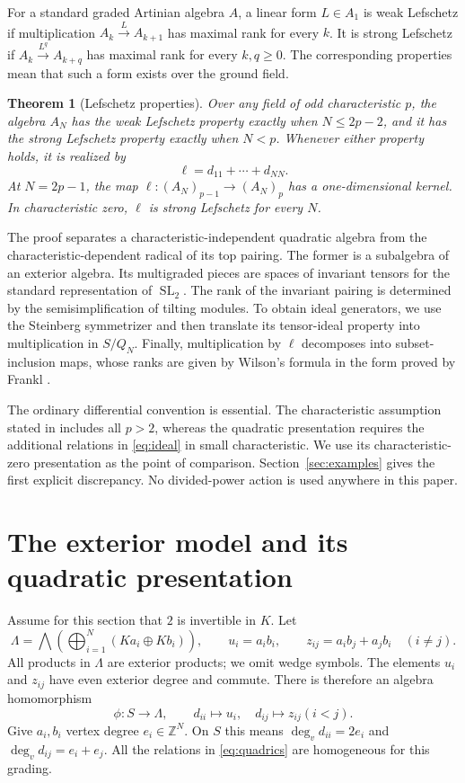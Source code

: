 \documentclass[11pt]{article}
\newtheorem{theorem}{Theorem}[section]
\theoremstyle{definition}
\theoremstyle{remark}
\numberwithin{equation}{section}
\DeclareMathOperator{\SL}{SL}
\newcommand{\kk}{K}
\begin{document}
For a standard graded Artinian algebra $A$, a linear form $L\in A_1$ is
weak Lefschetz if multiplication $A_k\xrightarrow{L}A_{k+1}$ has maximal
rank for every $k$. It is strong Lefschetz if
$A_k\xrightarrow{L^q}A_{k+q}$ has maximal rank for every $k,q\geq0$.
The corresponding properties mean that such a form exists over the
ground field.

\begin{theorem}[Lefschetz properties]\label{thm:lefschetz}
Over any field of odd characteristic $p$, the algebra $A_N$ has the weak
Lefschetz property exactly when $N\leq2p-2$, and it has the strong
Lefschetz property exactly when $N<p$. Whenever either property holds,
it is realized by
\[
 \ell=d_{11}+\cdots+d_{NN}.
\]
At $N=2p-1$, the map
$\ell:(A_N)_{p-1}\longrightarrow(A_N)_p$ has a one-dimensional kernel.
In characteristic zero, $\ell$ is strong Lefschetz for every $N$.
\end{theorem}

The proof separates a characteristic-independent quadratic algebra from
the characteristic-dependent radical of its top pairing. The former is a
subalgebra of an exterior algebra. Its multigraded pieces are spaces of
invariant tensors for the standard representation of $\SL_2$. The rank of
the invariant pairing is determined by the semisimplification of tilting
modules. To obtain ideal generators, we use the Steinberg symmetrizer and
then translate its tensor-ideal property into multiplication in $S/Q_N$.
Finally, multiplication by $\ell$ decomposes into subset-inclusion maps,
whose ranks are given by Wilson's formula in the form proved by Frankl
\cite[Theorem~4.1]{Frankl}.

The ordinary differential convention is essential. The characteristic
assumption stated in \cite{Shafiei} includes all $p>2$, whereas the
quadratic presentation requires the additional relations in
\eqref{eq:ideal} in small characteristic. We use its characteristic-zero
presentation as the point of comparison. Section~\ref{sec:examples}
gives the first explicit discrepancy. No divided-power action is used
anywhere in this paper.

\section{The exterior model and its quadratic presentation}
\label{sec:exterior}

Assume for this section that $2$ is invertible in $\kk$. Let
\[
 \Lambda=\bigwedge\left(\bigoplus_{i=1}^N
                 (\kk a_i\oplus\kk b_i)\right),\qquad
 u_i=a_i b_i,\qquad z_{ij}=a_i b_j+a_j b_i\quad(i\ne j).
\]
All products in $\Lambda$ are exterior products; we omit wedge symbols.
The elements $u_i$ and $z_{ij}$ have even exterior degree and commute.
There is therefore an algebra homomorphism
\begin{equation}\label{eq:phi}
 \phi:S\longrightarrow\Lambda,\qquad
 d_{ii}\longmapsto u_i,\quad d_{ij}\longmapsto z_{ij} (i<j).
\end{equation}
Give $a_i,b_i$ vertex degree $e_i\in\mathbb Z^N$. On $S$ this means
$\deg_v d_{ii}=2e_i$ and $\deg_v d_{ij}=e_i+e_j$. All the relations
in \eqref{eq:quadrics} are homogeneous for this grading.
\end{document}
